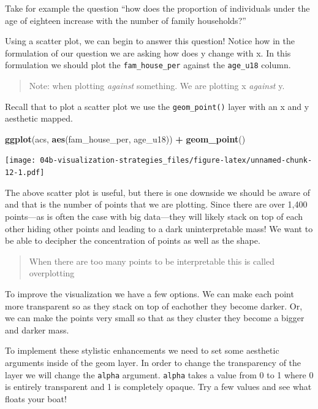\documentclass[
]{book}
\newenvironment{Shaded}{\begin{snugshade}}{\end{snugshade}}
\newcommand{\KeywordTok}[1]{\textcolor[rgb]{0.13,0.29,0.53}{\textbf{#1}}}
\newcommand{\NormalTok}[1]{#1}
\newcommand{\OperatorTok}[1]{\textcolor[rgb]{0.81,0.36,0.00}{\textbf{#1}}}
\newcommand{\StringTok}[1]{\textcolor[rgb]{0.31,0.60,0.02}{#1}}
\begin{document}
Take for example the question ``how does the proportion of individuals under the age of eighteen increase with the number of family households?''

Using a scatter plot, we can begin to answer this question! Notice how in the formulation of our question we are asking how does y change with x. In this formulation we should plot the \texttt{fam\_house\_per} against the \texttt{age\_u18} column.

\begin{quote}
Note: when plotting \emph{against} something. We are plotting x \emph{against} y.
\end{quote}

Recall that to plot a scatter plot we use the \texttt{geom\_point()} layer with an x and y aesthetic mapped.

\begin{Shaded}
\begin{Highlighting}[]
\KeywordTok{ggplot}\NormalTok{(acs, }\KeywordTok{aes}\NormalTok{(fam\_house\_per, age\_u18)) }\OperatorTok{+}
\StringTok{  }\KeywordTok{geom\_point}\NormalTok{()}
\end{Highlighting}
\end{Shaded}

\texttt{[image: 04b-visualization-strategies\_files/figure-latex/unnamed-chunk-12-1.pdf]}

The above scatter plot is useful, but there is one downside we should be aware of and that is the number of points that we are plotting. Since there are over 1,400 points---as is often the case with big data---they will likely stack on top of each other hiding other points and leading to a dark uninterpretable mass! We want to be able to decipher the concentration of points as well as the shape.

\begin{quote}
When there are too many points to be interpretable this is called overplotting
\end{quote}

To improve the visualization we have a few options. We can make each point more transparent so as they stack on top of eachother they become darker. Or, we can make the points very small so that as they cluster they become a bigger and darker mass.

To implement these stylistic enhancements we need to set some aesthetic arguments inside of the geom layer. In order to change the transparency of the layer we will change the \texttt{alpha} argument. \texttt{alpha} takes a value from 0 to 1 where 0 is entirely transparent and 1 is completely opaque. Try a few values and see what floats your boat!
\end{document}
